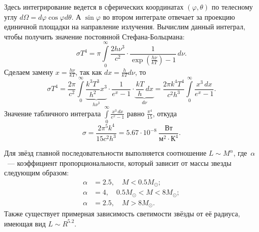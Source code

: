 Здесь интегрирование ведется в сферических координатах $(\varphi, \theta)$ по телесному углу $d\Omega = d\varphi \cos \varphi d\theta$. А $\sin \varphi$ во втором интеграле отвечает за проекцию единичной площадки на направление излучения. Вычислим данный интеграл, чтобы получить значение постоянной Стефана-Больцмана:
\begin{equation*}
    \sigma T^4 = \pi \int\limits_0^{\infty} \frac{2h\nu^3}{c^2}\cdot \frac{1}{\exp\left(\frac{h\nu}{kT}\right)-1} \,d \nu.
\end{equation*}
Сделаем замену $x = \frac{h \nu}{k T}$, так как $dx = \frac{h}{k T} d\nu$, то
\begin{equation*}
    \sigma T^4 = \frac{2\pi}{c^2}  \int\limits_0^{\infty} \underbrace{\frac{k^3 T^3}{h^2} x^3}_{h\nu^3} \cdot \frac{1}{e^x - 1} \cdot \underbrace{\frac{kT}{h} \,d x}_{d\nu} = \frac{2 \pi k^4 T^4}{c^2 h^3} \int\limits_0^{\infty} \frac{x^3 \,d x}{e^x - 1}.
\end{equation*}
Значение табличного интеграла $\int\limits_0^{\infty} \frac{x^3 \,d x}{e^x - 1}$ равно $\frac{\pi^4}{15}$, откуда
\begin{equation*}
    \sigma = \frac{2 \pi^5 k^4}{15 c^2 h^3} = 5.67 \cdot 10^{-8}~\frac{\text{Вт}}{\text{м}^2 \cdot \text{К}^4}.
\end{equation*}

Для звёзд главной последовательности выполняется соотношение $L \sim M^{\alpha}$, где~$\alpha$~--- коэффициент пропорциональности, который зависит от массы звезды следующим образом:
\begin{align*}
    \alpha &= 2.5,\quad M < 0.5 M_\odot; \\
    \alpha &= 4, \quad 0.5 M_\odot < M < 8 M_\odot;\\
    \alpha &= 2.5, \quad  M > 8 M_\odot.
\end{align*}
Также существует примерная зависимость светимости звёзды от её радиуса, имеющая вид  $L\sim R^{5.2}$.
